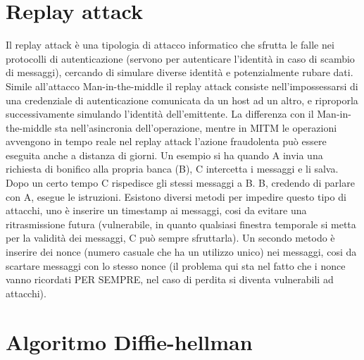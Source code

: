 \section{Replay attack}

Il replay attack è una tipologia di attacco informatico che sfrutta le falle nei protocolli di autenticazione (servono per autenticare l’identità in caso di scambio di messaggi), cercando di simulare diverse identità e potenzialmente rubare dati.
Simile all’attacco Man-in-the-middle il replay attack consiste nell'impossessarsi di una credenziale di autenticazione comunicata da un host ad un altro, e riproporla successivamente simulando l'identità dell'emittente. La differenza con il Man-in-the-middle sta nell’asincronia dell’operazione, mentre in MITM le operazioni avvengono in tempo reale nel replay attack l’azione fraudolenta può essere eseguita anche a distanza di giorni.
Un esempio si ha quando A invia una richiesta di bonifico alla propria banca (B), C intercetta i messaggi e li salva. Dopo un certo tempo C rispedisce gli stessi messaggi a B. B, credendo di parlare con A, esegue le istruzioni. 
Esistono diversi metodi per impedire questo tipo di attacchi, uno è inserire un timestamp ai messaggi, cosi da evitare una ritrasmissione futura (vulnerabile, in quanto qualsiasi finestra temporale si metta per la validità dei messaggi, C può sempre sfruttarla).
Un secondo metodo è inserire dei nonce (numero casuale che ha un utilizzo unico) nei messaggi,
cosi da scartare messaggi con lo stesso nonce (il problema qui sta nel fatto che i nonce vanno ricordati PER SEMPRE, nel caso di perdita si diventa vulnerabili ad attacchi).

\section{Algoritmo Diffie-hellman}

